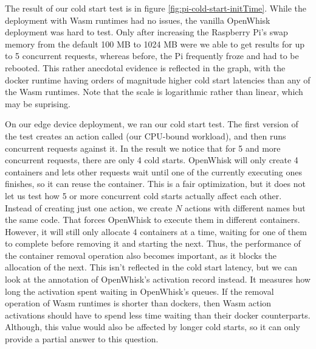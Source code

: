 The result of our cold start test is in figure \ref{fig:pi-cold-start-initTime}. While the deployment with Wasm runtimes had no issues, the vanilla OpenWhisk deployment was hard to test. Only after increasing the Raspberry Pi's swap memory from the default 100 MB to 1024 MB were we able to get results for up to 5 concurrent requests, whereas before, the Pi frequently froze and had to be rebooted. This rather anecdotal evidence is reflected in the graph, with the docker runtime having orders of magnitude higher cold start latencies than any of the Wasm runtimes. Note that the scale is logarithmic rather than linear, which may be suprising.


\begin{figure}
    \begin{center}
        
    \end{center}
    \caption{}
    \label{fig:pi-cold-start-waitTime}
\end{figure}

On our edge device deployment, we ran our cold start test. The first version of the test creates an action called  (our CPU-bound workload), and then runs concurrent requests against it. In the result we notice that for 5 and more concurrent requests, there are only 4 cold starts. OpenWhisk will only create 4 containers and lets other requests wait until one of the currently executing ones finishes, so it can reuse the container. This is a fair optimization, but it does not let us test how 5 or more concurrent cold starts actually affect each other. Instead of creating just one action, we create $N$ actions with different names but the same code. That forces OpenWhisk to execute them in different containers. However, it will still only allocate 4 containers at a time, waiting for one of them to complete before removing it and starting the next. Thus, the performance of the container removal operation also becomes important, as it blocks the allocation of the next. This isn't reflected in the cold start latency, but we can look at the  annotation of OpenWhisk's activation record instead. It measures how long the activation spent waiting in OpenWhisk's queues. If the removal operation of Wasm runtimes is shorter than dockers, then Wasm action activations should have to spend less time waiting than their docker counterparts. Although, this value would also be affected by longer cold starts, so it can only provide a partial answer to this question.

